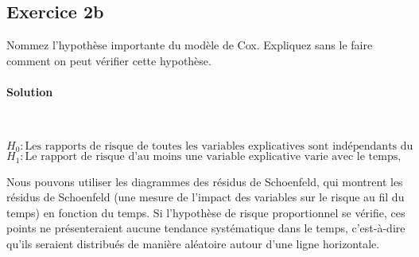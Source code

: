 \documentclass[../main.tex]{subfiles}
\begin{document}
\begin{CJK*}{UTF8}{gbsn}
    
\section*{Exercice 2b}
Nommez l'hypothèse importante du modèle de Cox. 
Expliquez sans le faire comment on peut vérifier cette hypothèse.
    
\paragraph{Solution}\
    
$H_0: \text{Les rapports de risque de toutes les variables explicatives sont indépendants du temps, signifiant que l'hypothèse des risques proportionnels est valide.}$
$H_1: \text{Le rapport de risque d'au moins une variable explicative varie avec le temps, indiquant que l'hypothèse des risques proportionnels n'est pas valide.}$
    
Nous pouvons utiliser les diagrammes des résidus de Schoenfeld, qui montrent les résidus de Schoenfeld (une mesure de l'impact des variables sur le risque au fil du temps) en fonction du temps. Si l'hypothèse de risque proportionnel se vérifie, ces points ne présenteraient aucune tendance systématique dans le temps, c'est-à-dire qu'ils seraient distribués de manière aléatoire autour d'une ligne horizontale.

\end{CJK*}
\end{document}
